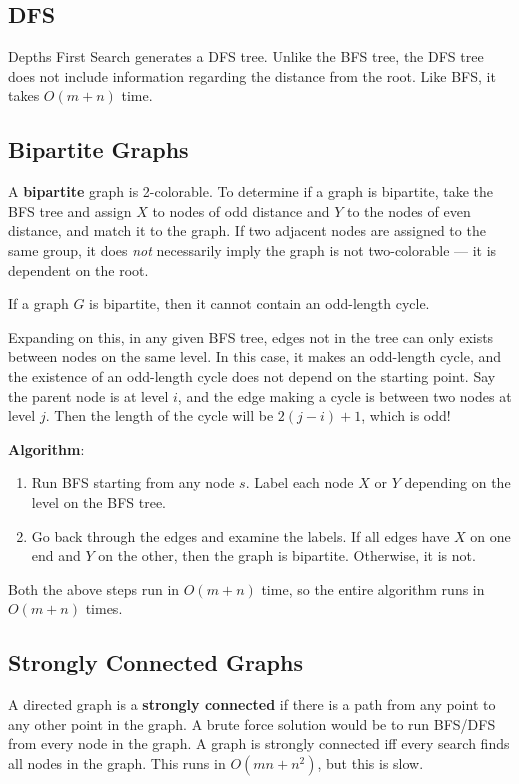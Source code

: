 \documentclass[11pt]{article}
\begin{document}
\subsection{DFS}
Depths First Search generates a DFS tree. Unlike the BFS tree, the DFS tree does not include information regarding the distance from the root. Like BFS, it takes $O(m+n)$ time.

\subsection{Bipartite Graphs}
A \textbf{bipartite} graph is 2-colorable. To determine if a graph is bipartite, take the BFS tree and assign $X$ to nodes of odd distance and $Y$ to the nodes of even distance, and match it to the graph. If two adjacent nodes are assigned to the same group, it does \textit{not} necessarily imply the graph is not two-colorable --- it is dependent on the root.

\begin{theorem}
If a graph $G$ is bipartite, then it cannot contain an odd-length cycle.
\end{theorem}

Expanding on this, in any given BFS tree, edges not in the tree can only exists between nodes on the same level. In this case, it makes an odd-length cycle, and the existence of an odd-length cycle does not depend on the starting point. Say the parent node is at level $i$, and the edge making a cycle is between two nodes at level $j$. Then the length of the cycle will be $2(j-i)+1$, which is odd!

\vspace{12pt}
\noindent \textbf{Algorithm}:
\begin{enumerate}
    \item Run BFS starting from any node $s$. Label each node $X$ or $Y$ depending on the level on the BFS tree.
    \item Go back through the edges and examine the labels. If all edges have $X$ on one end and $Y$ on the other, then the graph is bipartite. Otherwise, it is not.
\end{enumerate}
Both the above steps run in $O(m+n)$ time, so the entire algorithm runs in $O(m+n)$ times.

\subsection{Strongly Connected Graphs}
A directed graph is a \textbf{strongly connected} if there is a path from any point to any other point in the graph. A brute force solution would be to run BFS/DFS from every node in the graph. A graph is strongly connected iff every search finds all nodes in the graph. This runs in $O(mn + n^2)$, but this is slow.
\end{document}
